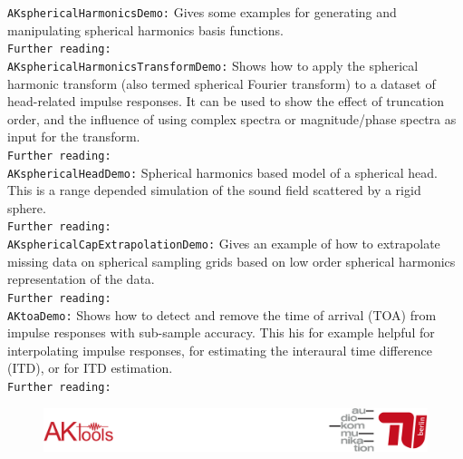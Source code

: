 \documentclass[11pt]{scrartcl}
\begin{document}
\noindent
{\color{tu_red}\texttt{AKsphericalHarmonicsDemo:}} Gives some examples for generating and manipulating spherical harmonics basis functions.\\
\texttt{Further reading:} \citet{William1999, Rafaely2015}\\

\noindent
{\color{tu_red}\texttt{AKsphericalHarmonicsTransformDemo:}} Shows how to apply the spherical harmonic transform (also termed spherical Fourier transform) to a dataset of head-related impulse responses. It can be used to show the effect of truncation order, and the influence of using complex spectra or magnitude/phase spectra as input for the transform.\\
\texttt{Further reading:} \citet{William1999, Rafaely2015}\\

\noindent
{\color{tu_red}\texttt{AKsphericalHeadDemo:}} Spherical harmonics based model of a spherical head. This is a range depended simulation of the sound field scattered by a rigid sphere.\\
\texttt{Further reading:} \citet{Duda1998}\\

\noindent
{\color{tu_red}\texttt{AKsphericalCapExtrapolationDemo:}} Gives an example of how to extrapolate missing data on spherical sampling grids based on low order spherical harmonics representation of the data.\\
\texttt{Further reading:} \citet{Ahrens2012a}\\

\noindent
{\color{tu_red}\texttt{AKtoaDemo:}} Shows how to detect and remove the time of arrival (TOA) from impulse responses with sub-sample accuracy. This his for example helpful for interpolating impulse responses, for estimating the interaural time difference (ITD), or for ITD estimation.\\
\texttt{Further reading:} \citet{Brinkmann2015, Katz2014, Lindau2010c}\\


\vfill
\begin{figure}[b!]
  \center
  \includegraphics[width=1\textwidth]{logo_footer}
\end{figure}

\clearpage
\end{document}
